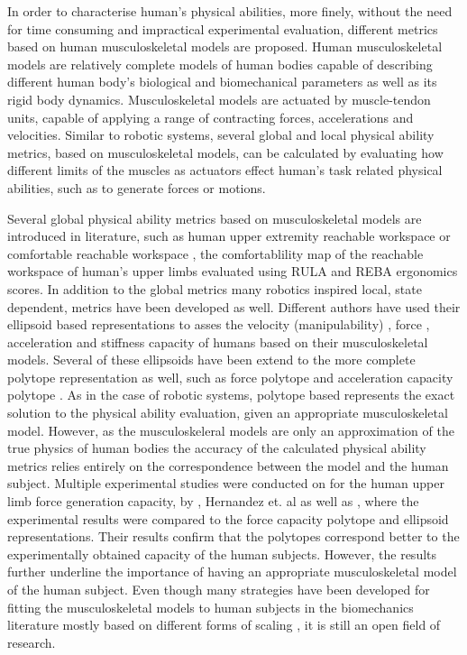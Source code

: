 In order to characterise human's physical abilities, more finely, without the need for time consuming and impractical experimental evaluation, different metrics based on human musculoskeletal models are proposed. Human musculoskeletal models are relatively complete models of human bodies capable of describing different human body's biological and biomechanical parameters as well as its rigid body dynamics. Musculoskeletal models are actuated by muscle-tendon units, capable of applying a range of contracting forces, accelerations and velocities. Similar to robotic systems, several global and local physical ability metrics, based on musculoskeletal models, can be calculated by evaluating how different limits of the muscles as actuators effect human's task related physical abilities, such as to generate forces or motions. 

Several global physical ability metrics based on musculoskeletal models are introduced in literature, such as human upper extremity reachable workspace \cite{Lenarcic1994,Kurillo2013} or comfortable reachable workspace \cite{Figueredo2021}, the comfortablility map of the reachable workspace of human's upper limbs evaluated using RULA and REBA ergonomics scores. In addition to the global metrics many robotics inspired local, state dependent, metrics have been developed as well. Different authors have used their ellipsoid based representations to asses the velocity (manipulability) \cite{Rezzoug2012manipulability}, force \cite{rezzoug_application_2012, lazinica_higher_2010}, acceleration \cite{khatib2009robotics} and stiffness \cite{Artemiadis2010} capacity of humans based on their musculoskeletal models. Several of these ellipsoids have been extend to the more complete polytope representation as well, such as force polytope \cite{sasaki2011vertex, rezzoug_application_2012, carmichael_estimating_2013} and acceleration capacity polytope \cite{khatib2009robotics, demircan2012muscle}. As in the case of robotic systems, polytope based represents the exact solution to the physical ability evaluation, given an appropriate musculoskeletal model. However, as the musculoskeleral models are only an approximation of the true physics of human bodies the accuracy of the calculated physical ability metrics relies entirely on the correspondence between the model and the human subject. Multiple experimental studies were conducted on for the human upper limb force generation capacity, by \citet{biomechanics1010008}, Hernandez et. al \cite{HERNANDEZ2015} as well as \citet{lazinica_higher_2010}, where the experimental results were compared to the force capacity polytope and ellipsoid representations. Their results confirm that the polytopes correspond better to the experimentally obtained capacity of the human subjects. However, the results further underline the importance of having an appropriate musculoskeletal model of the human subject. Even though many strategies have been developed for fitting the musculoskeletal models to human subjects in the biomechanics literature mostly based on different forms of scaling \cite{Lund2015, Ziyun2019}, it is still an open field of research. 

